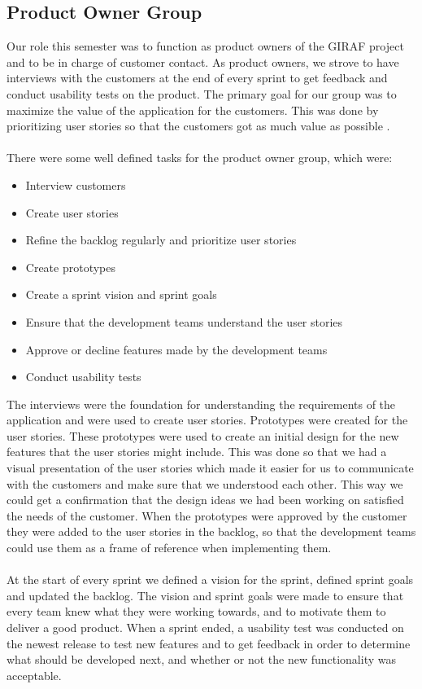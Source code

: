 \subsection{Product Owner Group}
Our role this semester was to function as product owners of the GIRAF project and to be in charge of customer contact. 
As product owners, we strove to have interviews with the customers at the end of every sprint to get feedback and conduct usability tests on the product.
The primary goal for our group was to maximize the value of the application for the customers. 
This was done by prioritizing user stories so that the customers got as much value as possible \autocite{TheScrumGuide}.\\
\\
There were some well defined tasks for the product owner group, which were:
\begin{itemize}
    \item Interview customers
    \item Create user stories    
    \item Refine the backlog regularly and prioritize user stories
    \item Create prototypes
    \item Create a sprint vision and sprint goals
    \item Ensure that the development teams understand the user stories
    \item Approve or decline features made by the development teams
    \item Conduct usability tests
\end{itemize}
\noindent
The interviews were the foundation for understanding the requirements of the application and were used to create user stories. 
Prototypes were created for the user stories.
These prototypes were used to create an initial design for the new features that the user stories might include. 
This was done so that we had a visual presentation of the user stories which made it easier for us to communicate with the customers and make sure that we understood each other. 
This way we could get a confirmation that the design ideas we had been working on satisfied the needs of the customer.
When the prototypes were approved by the customer they were added to the user stories in the backlog, so that the development teams could use them as a frame of reference when implementing them.
\\\\
At the start of every sprint we defined a vision for the sprint, defined sprint goals and updated the backlog. 
The vision and sprint goals were made to ensure that every team knew what they were working towards, and to motivate them to deliver a good product.
When a sprint ended, a usability test was conducted on the newest release to test new features and to get feedback in order to determine what should be developed next, and whether or not the new functionality was acceptable.


